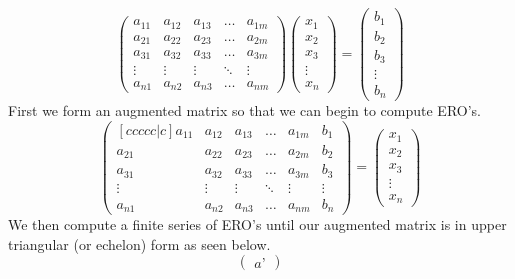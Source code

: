 \documentclass[12pt,reqno,twoside,titlepage]{article}
\theoremstyle{definition}
\begin{document}
\begin{equation*}
    \begin{pmatrix}
    a_{11} & a_{12} & a_{13} & \dots & a_{1m} \\
    a_{21} & a_{22} & a_{23} & \dots & a_{2m} \\
    a_{31} & a_{32} & a_{33} & \dots & a_{3m} \\
    \vdots & \vdots & \vdots & \ddots & \vdots \\
    a_{n1} & a_{n2} & a_{n3} & \dots & a_{nm}
    \end{pmatrix}
    \begin{pmatrix}
    x_{1} \\
    x_{2} \\
    x_{3} \\
    \vdots \\
    x_{n}
    \end{pmatrix}
    =
    \begin{pmatrix}
    b_{1} \\
    b_{2} \\
    b_{3} \\
    \vdots \\
    b_{n}
    \end{pmatrix}
\end{equation*}
\newline
First we form an augmented matrix so that we can begin to compute ERO’s.
\begin{equation*}
\begin{pmatrix}[ccccc|c]
a_{11} & a_{12} & a_{13} & \dots & a_{1m} & b_{1} \\
a_{21} & a_{22} & a_{23} & \dots & a_{2m} & b_{2} \\
a_{31} & a_{32} & a_{33} & \dots & a_{3m} & b_{3} \\
\vdots & \vdots & \vdots & \ddots & \vdots & \vdots \\
a_{n1} & a_{n2} & a_{n3} & \dots & a_{nm} & b_{n}
\end{pmatrix}
=
\begin{pmatrix}
x_{1} \\
x_{2} \\
x_{3} \\
\vdots \\
x_{n}
\end{pmatrix}
\end{equation*}
We then compute a finite series of ERO’s until our augmented matrix is in upper triangular (or echelon) form as seen below.
\begin{equation*}
    \begin{pmatrix}
    a’
    \end{pmatrix}
\end{equation*}
\end{document}

